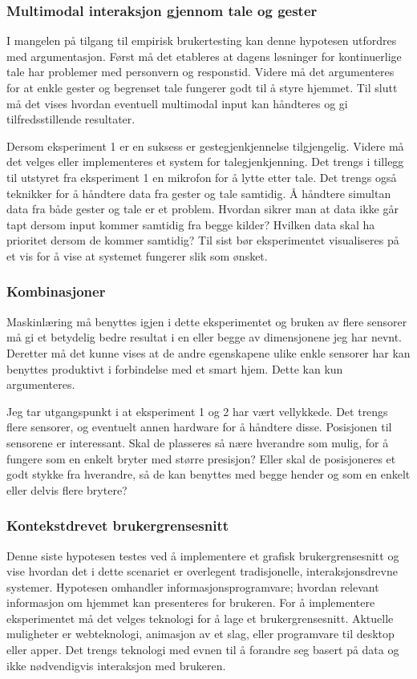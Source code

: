 \subsubsection*{Multimodal interaksjon gjennom tale og gester}
I mangelen på tilgang til empirisk brukertesting kan denne hypotesen utfordres med argumentasjon. Først må det etableres at dagens løsninger for kontinuerlige tale har problemer med personvern og responstid. Videre må det argumenteres for at enkle gester og begrenset tale fungerer godt til å styre hjemmet. Til slutt må det vises hvordan eventuell multimodal input kan håndteres og gi tilfredsstillende resultater.

Dersom eksperiment 1 er en suksess er gestegjenkjennelse tilgjengelig. Videre må det velges eller implementeres et system for talegjenkjenning. Det trengs i tillegg til utstyret fra eksperiment 1 en mikrofon for å lytte etter tale. Det trengs også teknikker for å håndtere data fra gester og tale samtidig. Å håndtere simultan data fra både gester og tale er et problem. Hvordan sikrer man at data ikke går tapt dersom input kommer samtidig fra begge kilder? Hvilken data skal ha prioritet dersom de kommer samtidig? Til sist bør eksperimentet visualiseres på et vis for å vise at systemet fungerer slik som ønsket.

\subsubsection*{Kombinasjoner}
Maskinlæring må benyttes igjen i dette eksperimentet og bruken av flere sensorer må gi et betydelig bedre resultat i en eller begge av dimensjonene jeg har nevnt. Deretter må det kunne vises at de andre egenskapene ulike enkle sensorer har kan benyttes produktivt i forbindelse med et smart hjem. Dette kan kun argumenteres.

Jeg tar utgangspunkt i at eksperiment 1 og 2 har vært vellykkede. Det trengs flere sensorer, og eventuelt annen hardware for å håndtere disse. Posisjonen til sensorene er interessant. Skal de plasseres så nære hverandre som mulig, for å fungere som en enkelt bryter med større presisjon? Eller skal de posisjoneres et godt stykke fra hverandre, så de kan benyttes med begge hender og som en enkelt eller delvis flere brytere?

\subsubsection*{Kontekstdrevet brukergrensesnitt}
Denne siste hypotesen testes ved å implementere et grafisk brukergrensesnitt og vise hvordan det i dette scenariet er overlegent tradisjonelle, interaksjonsdrevne systemer. Hypotesen omhandler informasjonsprogramvare; hvordan relevant informasjon om hjemmet kan presenteres for brukeren. For å implementere eksperimentet må det velges teknologi for å lage et brukergrensesnitt. Aktuelle muligheter er webteknologi, animasjon av et slag, eller programvare til desktop eller apper. Det trengs teknologi med evnen til å forandre seg basert på data og ikke nødvendigvis interaksjon med brukeren. \\

